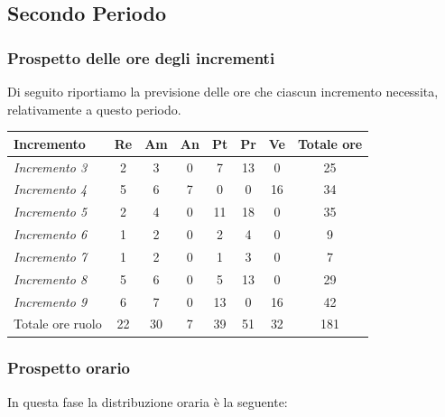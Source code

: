 {{{{{{{{{\subsection{Secondo Periodo}\label{PreventivoFaseDiProgettazioneDiDettaglioECodificaPeriodo2}

\subsubsection{Prospetto delle ore degli incrementi}\label{PreventivoFaseDiProgettazioneDiDettaglioECodificaPeriodo2Incrementi}
Di seguito riportiamo la previsione delle ore che ciascun incremento necessita, relativamente a questo periodo.
\quad
\def\tabularxcolumn#1{m{#1}}
{

	\begin{center}
		\renewcommand{\arraystretch}{1.4}
		\begin{tabularx}{\textwidth}{|X|c|c|c|c|c|c|c|}
			\hline
			\rowcolor{airforceblue}
			\textbf{Incremento} & \textbf{Re} & \textbf{Am} & \textbf{An} & \textbf{Pt} & \textbf{Pr} & \textbf{Ve} & \textbf{Totale ore}\\
			\hline
			\textit{Incremento 3} & 2 & 3 & 0 & 7 & 13 & 0 & 25\\
			\hline
			\textit{Incremento 4} & 5 & 6 & 7 & 0 & 0 & 16 & 34\\
			\hline
			\textit{Incremento 5} & 2 & 4 & 0 & 11 & 18 & 0 & 35\\
			\hline
			\textit{Incremento 6} & 1 & 2 & 0 & 2 & 4 & 0 & 9\\
			\hline
			\textit{Incremento 7} & 1 & 2 & 0 & 1 & 3 & 0 & 7\\
			\hline
			\textit{Incremento 8} & 5 & 6 & 0 & 5 & 13 & 0 & 29\\
			\hline
			\textit{Incremento 9} & 6 & 7 & 0 & 13 & 0 & 16 & 42\\
			\hline
			Totale ore ruolo & 22 & 30 & 7 & 39 & 51 & 32 & 181\\
			\hline
		\end{tabularx}
	\end{center}

	\subsubsection{Prospetto orario}\label{PreventivoFaseDiProgettazioneDiDettaglioECodificaProspettoOrarioPeriodo2}
	In questa fase la distribuzione oraria è la seguente:
	\quad
	\def\tabularxcolumn#1{m{#1}}
	{

}}}}}}}}}}}
